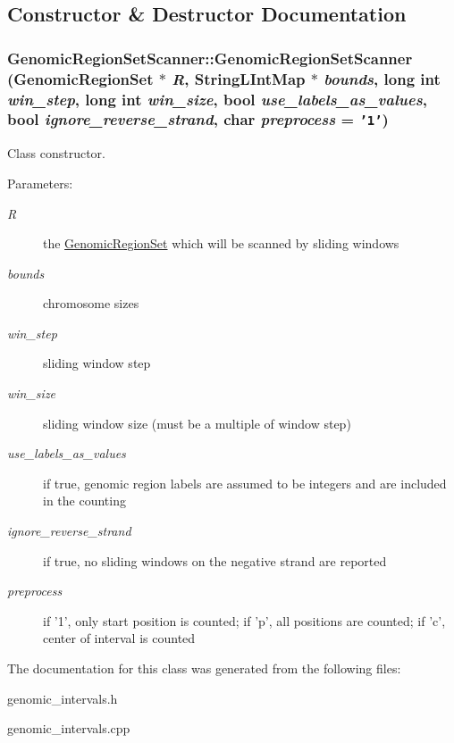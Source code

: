  

\subsection{Constructor \& Destructor Documentation}
\hypertarget{classGenomicRegionSetScanner_2703f6892137282f00618895e02f628b}{
\subsubsection[GenomicRegionSetScanner]{\setlength{\rightskip}{0pt plus 5cm}GenomicRegionSetScanner::GenomicRegionSetScanner ({\bf GenomicRegionSet} $\ast$ {\em R}, \/  StringLIntMap $\ast$ {\em bounds}, \/  long int {\em win\_\-step}, \/  long int {\em win\_\-size}, \/  bool {\em use\_\-labels\_\-as\_\-values}, \/  bool {\em ignore\_\-reverse\_\-strand}, \/  char {\em preprocess} = {\tt '1'})}}
\label{classGenomicRegionSetScanner_2703f6892137282f00618895e02f628b}


Class constructor. 

\begin{Desc}
\item[Parameters:]
\begin{description}
\item[{\em R}]the \hyperlink{classGenomicRegionSet}{GenomicRegionSet} which will be scanned by sliding windows \item[{\em bounds}]chromosome sizes \item[{\em win\_\-step}]sliding window step \item[{\em win\_\-size}]sliding window size (must be a multiple of window step) \item[{\em use\_\-labels\_\-as\_\-values}]if true, genomic region labels are assumed to be integers and are included in the counting \item[{\em ignore\_\-reverse\_\-strand}]if true, no sliding windows on the negative strand are reported \item[{\em preprocess}]if '1', only start position is counted; if 'p', all positions are counted; if 'c', center of interval is counted \end{description}
\end{Desc}


The documentation for this class was generated from the following files:\begin{CompactItemize}
\item 
genomic\_\-intervals.h\item 
genomic\_\-intervals.cpp\end{CompactItemize}
